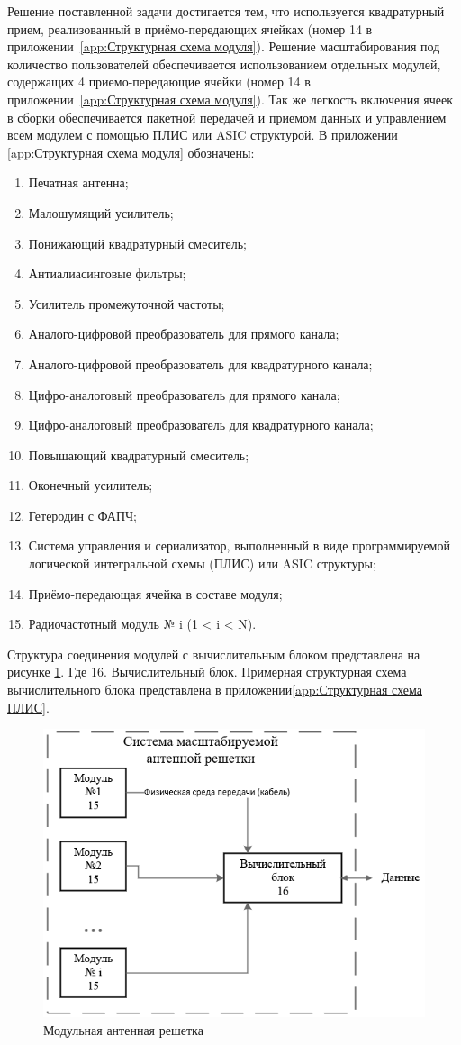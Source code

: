 \documentclass[utf8x, 14pt, oneside, a4paper]{article}
\begin{document}
	Решение поставленной задачи достигается тем, что используется квадратурный прием, реализованный в приёмо-передающих ячейках (номер 14 в приложении~\ref{app:Структурная схема модуля}). Решение масштабирования под количество пользователей обеспечивается использованием отдельных модулей, содержащих 4 приемо-передающие ячейки (номер 14 в приложении~\ref{app:Структурная схема модуля}). Так же легкость включения ячеек в сборки обеспечивается пакетной передачей и приемом данных и управлением всем модулем с помощью ПЛИС или ASIC структурой. 
	В приложении  \ref{app:Структурная схема модуля} обозначены:
	\begin{enumerate}
		\item Печатная антенна;
		\item Малошумящий усилитель;
		\item Понижающий квадратурный смеситель;
		\item Антиалиасинговые фильтры;
		\item Усилитель промежуточной частоты; 
		\item Аналого-цифровой преобразователь для прямого канала;
		\item Аналого-цифровой преобразователь для квадратурного канала;
		\item Цифро-аналоговый преобразователь для прямого канала;
		\item Цифро-аналоговый преобразователь для квадратурного канала;
		\item Повышающий квадратурный смеситель;
		\item Оконечный усилитель;
		\item Гетеродин с ФАПЧ;
		\item Система управления и сериализатор, выполненный в виде программируемой логической интегральной схемы (ПЛИС) или ASIC структуры;
		\item Приёмо-передающая ячейка в составе модуля;
		\item Радиочастотный модуль № i (1 < i < N). 
	\end{enumerate}	
	Структура соединения модулей с вычислительным блоком представлена на рисунке \ref{fig:Система антенной решетки}. Где 16. Вычислительный блок. Примерная структурная схема вычислительного блока представлена в приложении\ref{app:Структурная схема ПЛИС}.
	\begin{figure}[h]
		\centering
		\includegraphics[width=0.7\linewidth]{"Система антеной решетки"}
		\caption{Модульная антенная решетка }
		\label{fig:Система антенной решетки}
	\end{figure}
	
\end{document}

